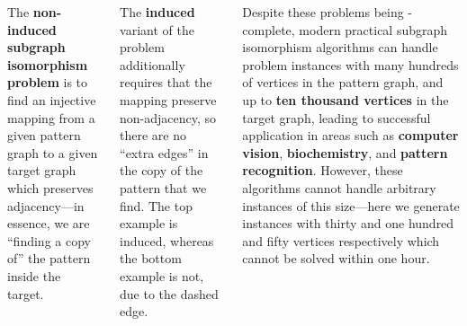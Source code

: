 \documentclass[a0paper]{tikzposter}
\begin{document}
\begin{columns}
{The \textbf{non-induced subgraph isomorphism problem} is to find an injective mapping from a given
pattern graph to a given target graph which preserves adjacency---in essence, we are ``finding a
copy of'' the pattern inside the target.

\bigskip

The \textbf{induced} variant of the problem additionally requires that the mapping preserve
non-adjacency, so there are no ``extra edges'' in the copy of the pattern that we find. The top
example is induced, whereas the bottom example is not, due to the dashed edge.

\bigskip

Despite these problems being \NP-complete, modern practical subgraph isomorphism algorithms can
handle problem instances with many hundreds of vertices in the pattern graph, and up to \textbf{ten thousand
vertices} in the target graph, leading to successful application in areas such as \textbf{computer
vision}, \textbf{biochemistry}, and \textbf{pattern recognition}. However, these algorithms cannot
handle arbitrary instances of this size---here we generate instances with thirty and one hundred and
fifty vertices respectively which cannot be solved within one hour.
}

\end{columns}
\end{document}
